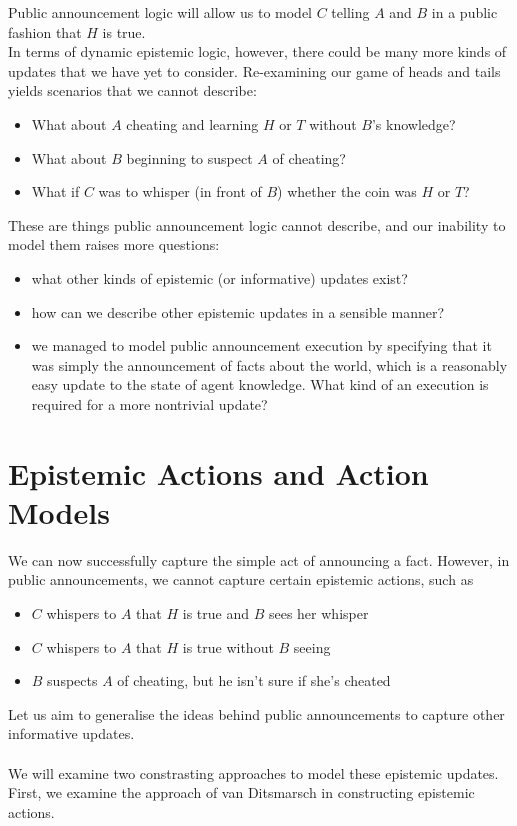 \documentclass[12pt, a4paper, twoside]{article}
\begin{document}
Public announcement logic will allow us to model $C$ telling $A$ and $B$ in a
public fashion that $H$ is true.
\\
In terms of dynamic epistemic logic, however, there could be many more kinds of
updates that we have yet to consider.
Re-examining our game of heads and tails yields scenarios that we cannot
describe:
\begin{itemize}
	\item What about $A$ cheating and learning $H$ or $T$ without $B$'s knowledge?
	\item What about $B$ beginning to suspect $A$ of cheating?
	\item What if $C$ was to whisper (in front of $B$) whether the coin was $H$
	or $T$?
\end{itemize}
These are things public announcement logic cannot describe, and our inability to
model them raises more questions:
\begin{itemize}
	\item what other kinds of epistemic (or informative) updates exist?
	\item how can we describe other epistemic updates in a sensible manner?
	\item we managed to model public announcement execution by specifying that it
	was simply the announcement of facts about the world, which is a reasonably
	easy update to the state of agent knowledge. What kind of an execution is
	required for a more nontrivial update?
\end{itemize}

\section{Epistemic Actions and Action Models} \label{estAct}
We can now successfully capture the simple act of announcing a fact.
However, in public announcements, we cannot capture certain epistemic actions,
such as
\begin{itemize} 
  \item $C$ whispers to $A$ that $H$ is true and $B$ sees her whisper
  \item $C$ whispers to $A$ that $H$ is true without $B$ seeing
  \item $B$ suspects $A$ of cheating, but he isn't sure if she's cheated
\end{itemize}
Let us aim to generalise the ideas behind public announcements to capture other
informative updates.\\
\\
We will examine two constrasting approaches to model these epistemic updates.
First, we examine the approach of van Ditsmarsch in constructing epistemic
actions.
\end{document}
